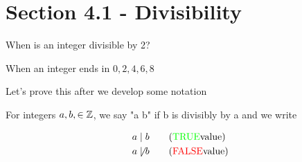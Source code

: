 \documentclass[../../Main.tex]{subfiles}
\begin{document}
\section{Section 4.1 - Divisibility}

\begin{question}
    When is an integer divisible by 2?

    \begin{solution}
        When an integer ends in $0, 2, 4, 6, 8$
    \end{solution}

    Let's prove this after we develop some notation
\end{question}

\begin{definition}[Divides]
    For integers $a, b, \in \mathbb{Z}$, we say "a  b" if b is divisibly by a and we write

    \begin{align*}
        a &\mid b \tag{\text{\TRUE value}} \\
        a &\not \mid b \tag{\text{\FALSE value}} \\
    \end{align*}

\end{definition}
\end{document}
